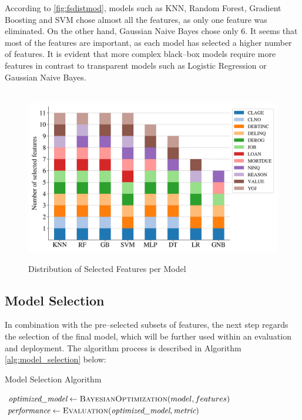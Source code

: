 According to \autoref{fig:fsdistmod}, models such as KNN, Random Forest, Gradient Boosting and SVM chose almost all the features, as only one feature was eliminated. On the other hand, Gaussian Naive Bayes chose only 6. It seems that most of the features are important, as each model has selected a higher number of features.
It is evident that more complex black--box models require more features in contrast to transparent models such as Logistic Regression or Gaussian Naive Bayes.
\begin{figure}[H]
    \centering
    \caption{Distribution of Selected Features per Model}\vspace{0.5em}
    \label{fig:fsdistmod}\
    \includegraphics[width=120mm]{Figures/Selected_Features_Distribution.jpg}

    \vspace{-1em}
\end{figure}

\newpage
\subsection{Model Selection}
\label{subsec:modelselection}

In combination with the pre--selected subsets of features, the next step regards the selection of the final model, which will be further used within an evaluation and deployment. The algorithm process is described in Algorithm \autoref{alg:model_selection} below:
\begin{algorithm}[H]
\caption{Model Selection Algorithm}
\label{alg:model_selection}
\begin{algorithmic}[1]
        \State $\textit{optimized\_model} \gets \textsc{BayesianOptimization}(model, features)$
        \For{$\textit{metric} \in \textit{evaluation\_metrics}$}
            \State $\textit{performance} \gets \textsc{Evaluation}(\textit{optimized\_model}, \textit{metric})$
        \EndFor
    \EndFor
\EndFor
\end{algorithmic}
\end{algorithm}


